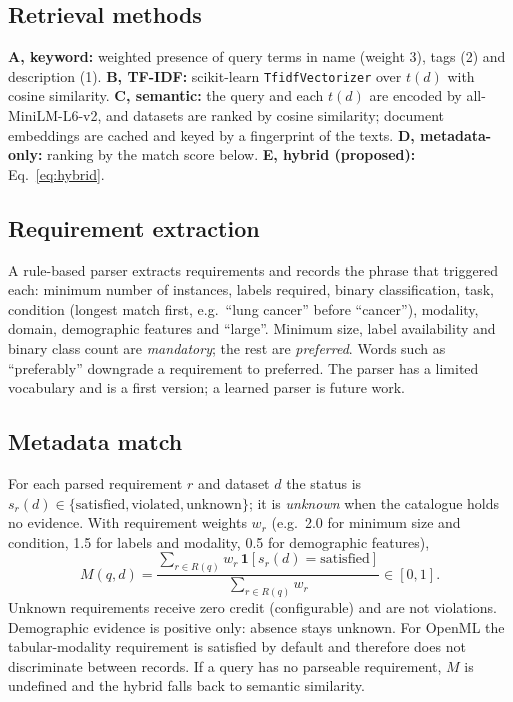 \documentclass[conference]{IEEEtran}
\begin{document}
\subsection{Retrieval methods}
\textbf{A, keyword:} weighted presence of query terms in name (weight 3), tags (2) and description (1). \textbf{B, TF-IDF:} scikit-learn \texttt{TfidfVectorizer} over $t(d)$ with cosine similarity. \textbf{C, semantic:} the query and each $t(d)$ are encoded by all-MiniLM-L6-v2, and datasets are ranked by cosine similarity; document embeddings are cached and keyed by a fingerprint of the texts. \textbf{D, metadata-only:} ranking by the match score below. \textbf{E, hybrid (proposed):} Eq.~\eqref{eq:hybrid}.

\subsection{Requirement extraction}
A rule-based parser extracts requirements and records the phrase that triggered each: minimum number of instances, labels required, binary classification, task, condition (longest match first, e.g.\ ``lung cancer'' before ``cancer''), modality, domain, demographic features and ``large''. Minimum size, label availability and binary class count are \emph{mandatory}; the rest are \emph{preferred}. Words such as ``preferably'' downgrade a requirement to preferred. The parser has a limited vocabulary and is a first version; a learned parser is future work.

\subsection{Metadata match}
For each parsed requirement $r$ and dataset $d$ the status is $s_r(d)\in\{\text{satisfied},\text{violated},\text{unknown}\}$; it is \emph{unknown} when the catalogue holds no evidence. With requirement weights $w_r$ (e.g.\ 2.0 for minimum size and condition, 1.5 for labels and modality, 0.5 for demographic features),
\begin{equation}
M(q,d)=\frac{\sum_{r\in R(q)} w_r\,\mathbf{1}[s_r(d)=\text{satisfied}]}{\sum_{r\in R(q)} w_r}\in[0,1].
\label{eq:meta}
\end{equation}
Unknown requirements receive zero credit (configurable) and are not violations. Demographic evidence is positive only: absence stays unknown. For OpenML the tabular-modality requirement is satisfied by default and therefore does not discriminate between records. If a query has no parseable requirement, $M$ is undefined and the hybrid falls back to semantic similarity.
\end{document}
